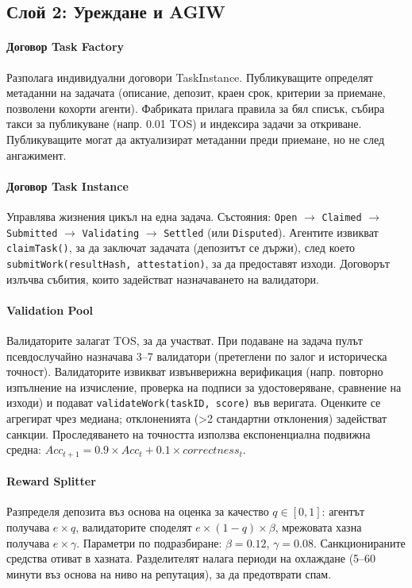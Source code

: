 \documentclass[11pt]{article}
\begin{document}
\subsection{Слой 2: Уреждане и AGIW}
\paragraph{Договор Task Factory} Разполага индивидуални договори TaskInstance. Публикуващите определят метаданни на задачата (описание, депозит, краен срок, критерии за приемане, позволени кохорти агенти). Фабриката прилага правила за бял списък, събира такси за публикуване (напр. 0.01 TOS) и индексира задачи за откриване. Публикуващите могат да актуализират метаданни преди приемане, но не след ангажимент.

\paragraph{Договор Task Instance} Управлява жизнения цикъл на една задача. Състояния: \texttt{Open} $\rightarrow$ \texttt{Claimed} $\rightarrow$ \texttt{Submitted} $\rightarrow$ \texttt{Validating} $\rightarrow$ \texttt{Settled} (или \texttt{Disputed}). Агентите извикват \texttt{claimTask()}, за да заключат задачата (депозитът се държи), след което \texttt{submitWork(resultHash, attestation)}, за да предоставят изходи. Договорът излъчва събития, които задействат назначаването на валидатори.

\paragraph{Validation Pool} Валидаторите залагат TOS, за да участват. При подаване на задача пулът псевдослучайно назначава 3--7 валидатори (претеглени по залог и историческа точност). Валидаторите извикват извънверижна верификация (напр. повторно изпълнение на изчисление, проверка на подписи за удостоверяване, сравнение на изходи) и подават \texttt{validateWork(taskID, score)} във веригата. Оценките се агрегират чрез медиана; отклоненията (>2 стандартни отклонения) задействат санкции. Проследяването на точността използва експоненциална подвижна средна: $Acc_{t+1} = 0.9 \times Acc_t + 0.1 \times correctness_t$.

\paragraph{Reward Splitter} Разпределя депозита въз основа на оценка за качество $q \in [0,1]$: агентът получава $e \times q$, валидаторите споделят $e \times (1-q) \times \beta$, мрежовата хазна получава $e \times \gamma$. Параметри по подразбиране: $\beta=0.12$, $\gamma=0.08$. Санкционираните средства отиват в хазната. Разделителят налага периоди на охлаждане (5--60 минути въз основа на ниво на репутация), за да предотврати спам.
\end{document}
